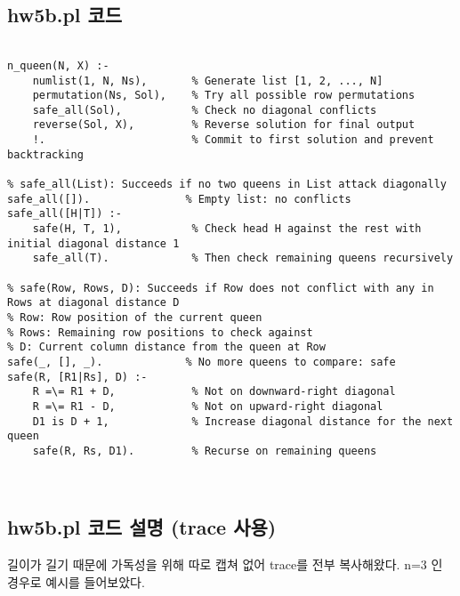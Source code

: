 \documentclass{article}
\begin{document}
\subsection{hw5b.pl 코드}
\begin{lstlisting}

n_queen(N, X) :-
    numlist(1, N, Ns),       % Generate list [1, 2, ..., N]
    permutation(Ns, Sol),    % Try all possible row permutations
    safe_all(Sol),           % Check no diagonal conflicts
    reverse(Sol, X),         % Reverse solution for final output
    !.                       % Commit to first solution and prevent backtracking

% safe_all(List): Succeeds if no two queens in List attack diagonally
safe_all([]).               % Empty list: no conflicts
safe_all([H|T]) :-
    safe(H, T, 1),           % Check head H against the rest with initial diagonal distance 1
    safe_all(T).             % Then check remaining queens recursively

% safe(Row, Rows, D): Succeeds if Row does not conflict with any in Rows at diagonal distance D
% Row: Row position of the current queen
% Rows: Remaining row positions to check against
% D: Current column distance from the queen at Row
safe(_, [], _).             % No more queens to compare: safe
safe(R, [R1|Rs], D) :-
    R =\= R1 + D,            % Not on downward-right diagonal
    R =\= R1 - D,            % Not on upward-right diagonal
    D1 is D + 1,             % Increase diagonal distance for the next queen
    safe(R, Rs, D1).         % Recurse on remaining queens



\end{lstlisting}

\subsection{hw5b.pl 코드 설명 (trace 사용)}

길이가 길기 때문에 가독성을 위해 따로 캡쳐 없어 trace를 전부 복사해왔다. n=3 인 경우로 예시를 들어보았다.  
\end{document}
